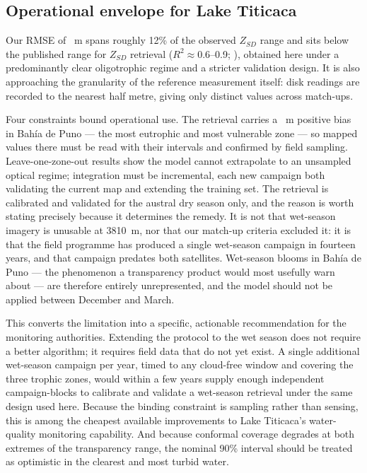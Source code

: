 \documentclass[final,5p,times,twocolumn,authoryear]{elsarticle}
\begin{document}
\subsection{Operational envelope for Lake Titicaca}\label{sec:envelope}

Our RMSE of \numHeadlineRmse~m spans roughly 12\% of the observed $Z_{SD}$
range and sits below the published range for $Z_{SD}$ retrieval
($R^2\approx0.6$--0.9; \citealp{Zhang2022,Lee2015}), obtained here under a
predominantly clear oligotrophic regime and a stricter validation design. It
is also approaching the granularity of the reference measurement itself:
disk readings are recorded to the nearest half metre, giving only
\numSecchiUniqueValues{} distinct values across \numMatchupsSecchi{}
match-ups.

Four constraints bound operational use. The retrieval carries a
\numZoneBahiaDePunoBias~m positive bias in Bah\'ia de Puno --- the most
eutrophic and most vulnerable zone --- so mapped values there must be read
with their intervals and confirmed by field sampling. Leave-one-zone-out
results show the model cannot extrapolate to an unsampled optical regime;
integration must be incremental, each new campaign both validating the
current map and extending the training set. The retrieval is calibrated and validated for
the austral dry season only, and the reason is worth stating precisely
because it determines the remedy. It is not that wet-season imagery is
unusable at 3810~m, nor that our match-up criteria excluded it: it is that
the field programme has produced a single wet-season campaign in fourteen
years, and that campaign predates both satellites. Wet-season blooms in
Bah\'ia de Puno --- the phenomenon a transparency product would most usefully
warn about --- are therefore entirely unrepresented, and the model should not
be applied between December and March.

This converts the limitation into a specific, actionable recommendation for
the monitoring authorities. Extending the protocol to the wet season does not
require a better algorithm; it requires field data that do not yet exist. A
single additional wet-season campaign per year, timed to any cloud-free
window and covering the three trophic zones, would within a few years supply
enough independent campaign-blocks to calibrate and validate a wet-season
retrieval under the same design used here. Because the binding constraint is
sampling rather than sensing, this is among the cheapest available
improvements to Lake Titicaca's water-quality monitoring capability. And because conformal coverage degrades at both
extremes of the transparency range, the nominal 90\% interval should be
treated as optimistic in the clearest and most turbid water.
\end{document}
